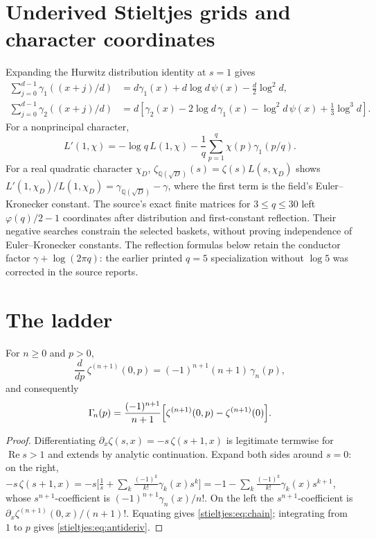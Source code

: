 \section{Underived Stieltjes grids and character coordinates}
Expanding the Hurwitz distribution identity at $s=1$ gives
\begin{align*}
\sum_{j=0}^{d-1}\gamma_1((x+j)/d)
&=d\gamma_1(x)+d\log d\,\psi(x)-\frac d2\log^2d,\\
\sum_{j=0}^{d-1}\gamma_2((x+j)/d)
&=d\left[\gamma_2(x)-2\log d\,\gamma_1(x)
-\log^2d\,\psi(x)+\frac13\log^3d\right].
\end{align*}
For a nonprincipal character,
\[
L'(1,\chi)=-\log q\,L(1,\chi)
-\frac1q\sum_{p=1}^{q}\chi(p)\gamma_1(p/q).
\]
For a real quadratic character $\chi_D$,
$\zeta_{\mathbb Q(\sqrt D)}(s)=\zeta(s)L(s,\chi_D)$ shows
$L'(1,\chi_D)/L(1,\chi_D)=\gamma_{\mathbb Q(\sqrt D)}-\gamma$,
where the first term is the field's Euler--Kronecker constant.
The source's exact finite matrices for $3\le q\le30$ left
$\varphi(q)/2-1$ coordinates after distribution and first-constant
reflection. Their negative searches constrain the selected baskets,
without proving independence of Euler--Kronecker constants.
The reflection formulas below retain the conductor factor
$\gamma+\log(2\pi q)$: the earlier printed $q=5$ specialization without
$\log5$ was corrected in the source reports.

\section{The ladder}\label{stieltjes:sec:ladder}

\begin{theorem}\label{stieltjes:thm:ladder}
For $n\ge0$ and $p>0$,
\begin{equation}\label{stieltjes:eq:chain}
\frac{d}{dp}\,\zeta^{(n+1)}(0,p)=(-1)^{n+1}(n+1)\,\gamma_n(p),
\end{equation}
and consequently
\begin{equation}\label{stieltjes:eq:antideriv}
\Gamma_{\!n}(p)=\frac{(-1)^{n+1}}{n+1}\Bigl[\zeta^{(n+1)}(0,p)-\zeta^{(n+1)}(0)\Bigr].
\end{equation}
\end{theorem}

\begin{proof}
Differentiating $\partial_x\zeta(s,x)=-s\,\zeta(s+1,x)$ is legitimate
termwise for $\operatorname{Re}s>1$ and extends by analytic continuation.
Expand both sides around $s=0$: on the right,
$-s\,\zeta(s+1,x)=-s\bigl[\tfrac1s+\sum_k\tfrac{(-1)^k}{k!}\gamma_k(x)s^k\bigr]
=-1-\sum_k\tfrac{(-1)^k}{k!}\gamma_k(x)s^{k+1}$,
whose $s^{n+1}$-coefficient is $(-1)^{n+1}\gamma_n(x)/n!$. On the left the
$s^{n+1}$-coefficient is $\partial_x\zeta^{(n+1)}(0,x)/(n+1)!$. Equating gives
\eqref{stieltjes:eq:chain}; integrating from $1$ to $p$ gives \eqref{stieltjes:eq:antideriv}.
\end{proof}

